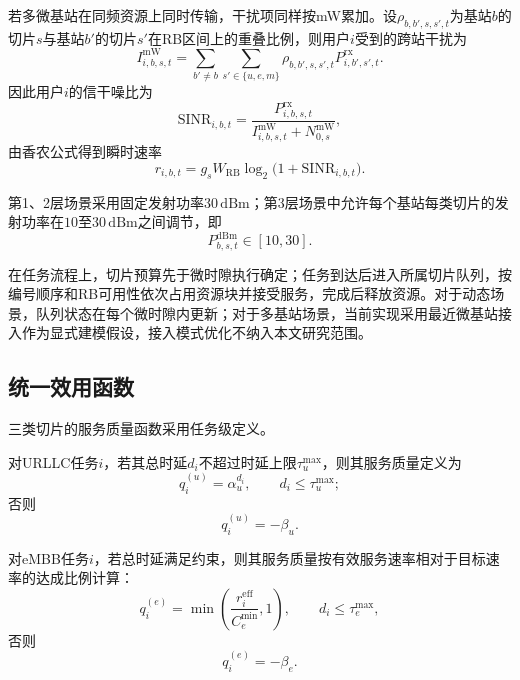 \documentclass[UTF8,a4paper,12pt,fontset=fandol]{ctexart}
\begin{document}
若多微基站在同频资源上同时传输，干扰项同样按mW累加。设$\rho_{b,b',s,s',t}$为基站$b$的切片$s$与基站$b'$的切片$s'$在RB区间上的重叠比例，则用户$i$受到的跨站干扰为
\begin{equation}
  I_{i,b,s,t}^{\text{mW}} =
  \sum_{b'\neq b}\sum_{s'\in\{u,e,m\}}
  \rho_{b,b',s,s',t} P^{\text{rx}}_{i,b',s',t}.
\end{equation}
因此用户$i$的信干噪比为
\begin{equation}
  \mathrm{SINR}_{i,b,t} =
  \frac{P^{\text{rx}}_{i,b,s,t}}
  {I_{i,b,s,t}^{\text{mW}} + N_{0,s}^{\text{mW}}},
\end{equation}
由香农公式得到瞬时速率
\begin{equation}
  r_{i,b,t}=g_s W_{\text{RB}}\log_2\bigl(1+\mathrm{SINR}_{i,b,t}\bigr).
\end{equation}

第1、2层场景采用固定发射功率$30\,\mathrm{dBm}$；第3层场景中允许每个基站每类切片的发射功率在$10$至$30\,\mathrm{dBm}$之间调节，即
\begin{equation}
  P_{b,s,t}^{\text{dBm}}\in [10,30].
\end{equation}

在任务流程上，切片预算先于微时隙执行确定；任务到达后进入所属切片队列，按编号顺序和RB可用性依次占用资源块并接受服务，完成后释放资源。对于动态场景，队列状态在每个微时隙内更新；对于多基站场景，当前实现采用最近微基站接入作为显式建模假设，接入模式优化不纳入本文研究范围。

\subsection{统一效用函数}

三类切片的服务质量函数采用任务级定义。

对URLLC任务$i$，若其总时延$d_i$不超过时延上限$\tau_u^{\max}$，则其服务质量定义为
\begin{equation}
  q_i^{(u)} =
  \alpha_u^{d_i},\qquad d_i\le \tau_u^{\max};
\end{equation}
否则
\begin{equation}
  q_i^{(u)} = -\beta_u.
\end{equation}

对eMBB任务$i$，若总时延满足约束，则其服务质量按有效服务速率相对于目标速率的达成比例计算：
\begin{equation}
  q_i^{(e)}=
  \min\left(\frac{r_i^{\text{eff}}}{C_e^{\min}},1\right),\qquad d_i\le \tau_e^{\max},
\end{equation}
否则
\begin{equation}
  q_i^{(e)}=-\beta_e.
\end{equation}
\end{document}
